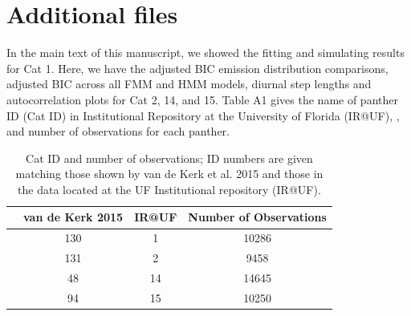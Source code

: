 \documentclass{article}\usepackage[]{graphicx}\usepackage{xcolor}
\begin{document}
\section*{Additional files}

  In the main text of this manuscript, we showed the fitting and simulating results for Cat 1. Here, we have the adjusted BIC emission distribution comparisons, adjusted BIC across all FMM and HMM models, diurnal step lengths and autocorrelation plots for Cat 2, 14, and 15. Table A1 gives the name of panther ID (Cat ID) in Institutional Repository at the University of Florida (IR@UF), \cite{kerk2015hidden}, and number of observations for each panther. 
  
  
\begin{table}[h!]
\caption{Cat ID and number of observations; ID numbers are given matching
those shown by van de Kerk et al. 2015 and those 
in the data located at the UF Institutional repository (IR@UF).}
\begin{tabular}{cccc}
  \hline
  & van de Kerk 2015  & IR@UF   & Number of Observations\\ \hline
  & 130 & 1 & 10286\\
  & 131 & 2  & 9458\\
  & 48 & 14  & 14645\\
  & 94  & 15   & 10250\\ \hline
\end{tabular}
\end{table}
  
\newpage
\end{document}
